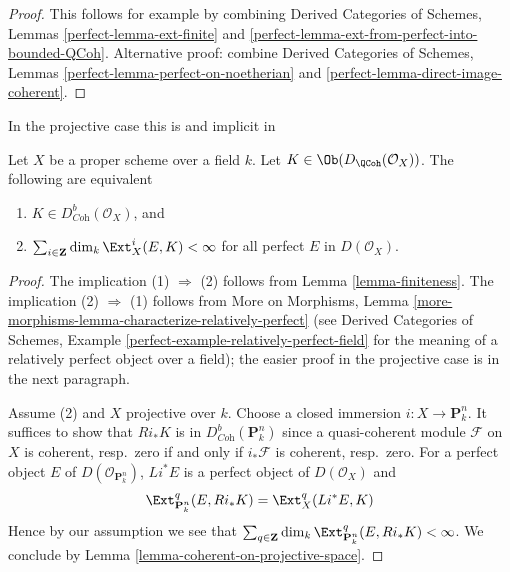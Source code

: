 \begin{proof}
This follows for example by combining
Derived Categories of Schemes, Lemmas \ref{perfect-lemma-ext-finite} and
\ref{perfect-lemma-ext-from-perfect-into-bounded-QCoh}.
Alternative proof: combine
Derived Categories of Schemes, Lemmas
\ref{perfect-lemma-perfect-on-noetherian} and
\ref{perfect-lemma-direct-image-coherent}.
\end{proof}

\begin{lemma}
\label{lemma-characterize-dbcoh-projective}
\begin{reference}
In the projective case this is \cite[Lemma 7.46]{Rouquier-dimensions}
and implicit in \cite[Theorem A.1]{BvdB}
\end{reference}
Let $X$ be a proper scheme over a field $k$. Let
$K \in \Ob(D_\QCoh(\mathcal{O}_X))$. The following are equivalent
\begin{enumerate}
\item $K \in D^b_{\textit{Coh}}(\mathcal{O}_X)$, and
\item $\sum_{i \in \mathbf{Z}} \dim_k \Ext^i_X(E, K) < \infty$
for all perfect $E$ in $D(\mathcal{O}_X)$.
\end{enumerate}
\end{lemma}

\begin{proof}
The implication (1) $\Rightarrow$ (2) follows from
Lemma \ref{lemma-finiteness}.
The implication (2) $\Rightarrow$ (1) follows from
More on Morphisms, Lemma
\ref{more-morphisms-lemma-characterize-relatively-perfect}
(see Derived Categories of Schemes, Example
\ref{perfect-example-relatively-perfect-field}
for the meaning of a relatively perfect object over a field);
the easier proof in the projective case is in the next paragraph.

\medskip\noindent
Assume (2) and $X$ projective over $k$.
Choose a closed immersion $i : X \to \mathbf{P}^n_k$. It suffices to show
that $Ri_*K$ is in $D^b_{\textit{Coh}}(\mathbf{P}^n_k)$ since a quasi-coherent
module $\mathcal{F}$ on $X$ is coherent, resp.\ zero if and only if
$i_*\mathcal{F}$ is coherent, resp.\ zero. For a perfect object $E$
of $D(\mathcal{O}_{\mathbf{P}^n_k})$, $Li^*E$ is a perfect object of
$D(\mathcal{O}_X)$ and
$$
\Ext^q_{\mathbf{P}^n_k}(E, Ri_*K) = \Ext^q_X(Li^*E, K)
$$
Hence by our assumption we see that
$\sum_{q \in \mathbf{Z}} \dim_k \Ext^q_{\mathbf{P}^n_k}(E, Ri_*K) < \infty$.
We conclude by Lemma \ref{lemma-coherent-on-projective-space}.
\end{proof}





